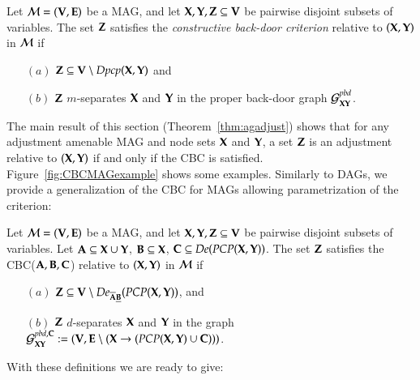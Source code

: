 \begin{definition}\label{def:ac:general:bdc:mag}
Let ${\cal M} = ({\bf V},{\bf E})$ be a MAG, and 
let ${\bf X},{\bf Y},{\bf Z} \subseteq {\bf V}$ be pairwise disjoint subsets of variables. 
The set ${\bf Z}$ satisfies the 
\emph{constructive back-door criterion}
relative to $({\bf X}, {\bf Y})$ in ${\cal M}$  if
\begin{enumerate}
  \item[$(a)$] ${\bf Z} \subseteq {\bf V} \setminus \textit{Dpcp}({\bf X},{\bf Y})$ and 
  \item[$(b)$] 
    ${\bf Z}$ $m$-separates ${\bf X}$ and ${\bf Y}$ in the proper back-door graph 
      ${\cal G}^{pbd}_{{\bf X}{\bf Y}}$.
\end{enumerate}
\end{definition}

The main result of this section (Theorem~\ref{thm:agadjust}) shows that 
for any adjustment amenable MAG and node sets ${\bf X}$ and ${\bf Y}$, a set ${\bf Z}$ is an adjustment relative to 
$({\bf X},{\bf Y})$ if and only if the CBC is satisfied.
Figure~\ref{fig:CBCMAGexample} shows some examples. 
Similarly to DAGs, we provide  a generalization of the CBC for MAGs allowing parametrization of the criterion: 


\begin{definition}\label{def:ac:general:bdc:mag:prime}
Let ${\cal M} = ({\bf V},{\bf E})$ be a MAG, and 
let ${\bf X},{\bf Y},{\bf Z} \subseteq {\bf V}$ be pairwise disjoint subsets of variables. 
Let ${\bf A} \subseteq {\bf X} \cup {\bf Y} $, ${\bf B} \subseteq {\bf X} $, ${\bf C} \subseteq \textit{De}(\textit{PCP}({\bf X},{\bf Y}))$.
The set ${\bf Z}$ satisfies the CBC(${\bf A},{\bf B},{\bf C} $) %
relative to $({\bf X}, {\bf Y})$ in ${\cal M}$  if 
\begin{enumerate} 
  \item[$(a)$] ${\bf Z} \subseteq {\bf V} \setminus De_{\overline{{\bf A}}\underline{{\bf B}}}(\textit{PCP}({\bf X},{\bf Y}))$, and
\item[$(b)$] 
    ${\bf Z}$ $d$-separates ${\bf X}$ and ${\bf Y}$ in the graph ${\cal G}^{pbd,{\bf C}}_{{\bf X}{\bf Y}} := ({\bf V},{\bf E} \setminus ({\bf X} \to (\textit{PCP}({\bf X},{\bf Y}) \cup {\bf C}) ))$.
\end{enumerate}
\end{definition}


With these definitions we are ready to give:

